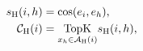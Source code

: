 \begin{equation}
 \begin{aligned}
 s_{\rm H}(i,h)&=\cos(e_i,e_h),\\
 \mathcal C_{\rm H}(i)&=\underset{x_h\in\mathcal A_{\rm H}(i)}{\operatorname{TopK}}s_{\rm H}(i,h),
 \end{aligned}\label{eq:history_selection}
\end{equation}
